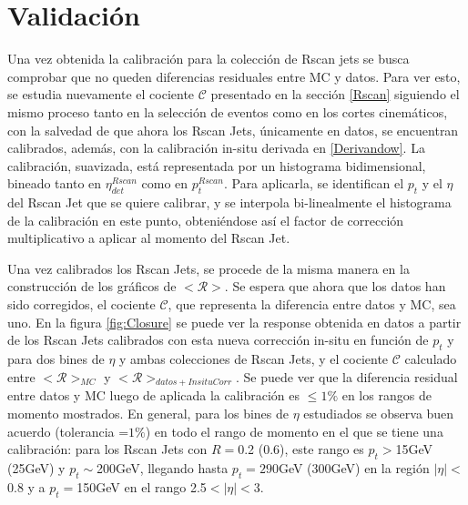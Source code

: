 \chapter{Validación}\label{Validation}

Una vez obtenida la calibración para la colección de Rscan jets se busca comprobar que no queden diferencias residuales entre MC y datos. Para ver esto, se estudia nuevamente el cociente $\mathcal{C}$ presentado en la sección \ref{Rscan} siguiendo el mismo proceso tanto en la selección de eventos como en los cortes cinemáticos, con la salvedad de que ahora los Rscan Jets, únicamente en datos, se encuentran calibrados, además, con la calibración in-situ derivada en \ref{Derivandow}. La calibración, suavizada, está representada por un histograma bidimensional, bineado tanto en $\eta^{Rscan}_{det}$ como en $p_t^{Rscan}$. Para aplicarla, se identifican el $p_t$ y el $\eta$ del Rscan Jet que se quiere calibrar, y se interpola bi-linealmente el histograma de la calibración en este punto, obteniéndose así el factor de corrección multiplicativo a aplicar al momento del Rscan Jet. 

Una vez calibrados los Rscan Jets, se procede de la misma manera en la construcción de los gráficos de $<\mathcal{R}>$. Se espera que ahora que los datos han sido corregidos, el cociente $\mathcal{C}$, que representa la diferencia entre datos y MC, sea uno. En la figura \ref{fig:Closure} se puede ver la response obtenida en datos a partir de los Rscan Jets calibrados con esta nueva corrección in-situ en función de $p_t$ y para dos bines de $\eta$ y ambas colecciones de Rscan Jets, y el cociente $\mathcal{C}$ calculado entre $<\mathcal{R}>_{MC}$ y $<\mathcal{R}>_{datos+InsituCorr}$. Se puede ver que la diferencia residual entre datos y MC luego de aplicada la calibración es $\leq 1\%$ en los rangos de momento mostrados. En general, para los bines de $\eta$ estudiados se observa buen acuerdo (tolerancia =$1\%$) en todo el rango de momento en el que se tiene una calibración: para los Rscan Jets con $R=$0.2 (0.6), este rango es $p_t>$15GeV (25GeV) y $p_t\sim$200GeV, llegando hasta $p_t=290$GeV (300GeV) en la región $|\eta|<$0.8 y a $p_t=$150GeV en el rango 2.5$<|\eta|<$3.



